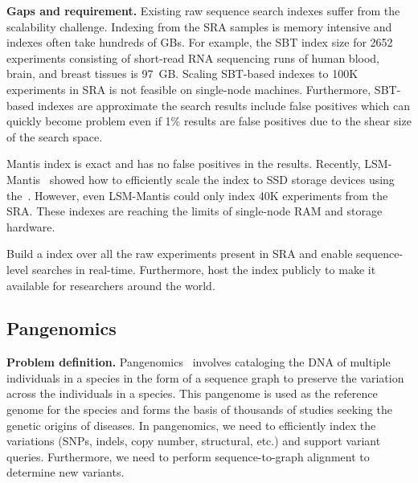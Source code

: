 \noindent
\textbf{Gaps and requirement.}
Existing raw sequence search indexes suffer from the scalability challenge. Indexing \kmers from the SRA samples is memory intensive and indexes often take hundreds of GBs. For example, the SBT index size for 2652 experiments consisting of short-read RNA sequencing runs of human blood, brain, and breast tissues is 97~GB\@. Scaling SBT-based indexes to 100K experiments in SRA is not feasible on single-node machines.
Furthermore, SBT-based indexes are approximate the search results include false positives which can quickly become problem even if 1\% results are false positives due to the shear size of the search space.

Mantis index is exact and has no false positives in the results. Recently, LSM-Mantis~\cite{almodaresi2022incrementally} showed how to efficiently scale the index to SSD storage devices using the~\cite{BentleyS80}. However, even LSM-Mantis could only index 40K experiments from the SRA\@. These indexes are reaching the limits of single-node RAM and storage hardware.

\begin{rproblem}
Build a \kmer index over all the raw experiments present in SRA and enable sequence-level searches in real-time. Furthermore, host the index publicly to make it available for researchers around the world.
\label{rprob:seq-search}
\end{rproblem}

\subsection{Pangenomics}

\textbf{Problem definition.}
Pangenomics~\cite{sherman2020pan} involves cataloging the DNA of multiple individuals in a species in the form of a sequence graph to preserve the variation across the individuals in a species. This pangenome is used as the reference genome for the species and forms the basis of thousands of studies seeking the genetic origins of diseases. In pangenomics, we need to efficiently index the variations (SNPs, indels, copy number, structural, etc.) and support variant queries. Furthermore, we need to perform sequence-to-graph alignment to determine new variants.


